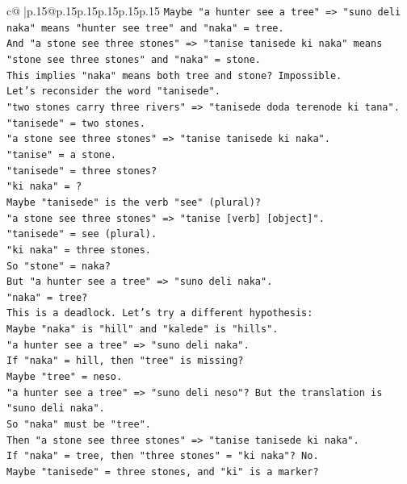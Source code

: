 \documentclass{article}
\begin{document}
{\begin{supertabular}{c@{$\;$}|p{.15\linewidth}@{}p{.15\linewidth}p{.15\linewidth}p{.15\linewidth}p{.15\linewidth}p{.15\linewidth}}
{{{\texttt{Maybe "a hunter see a tree" => "suno deli naka" means "hunter see tree" and "naka" = tree.} \\
\texttt{And "a stone see three stones" => "tanise tanisede ki naka" means "stone see three stones" and "naka" = stone.} \\
\texttt{This implies "naka" means both tree and stone? Impossible.} \\
\texttt{Let's reconsider the word "tanisede".} \\
\texttt{"two stones carry three rivers" => "tanisede doda terenode ki tana".} \\
\texttt{"tanisede" = two stones.} \\
\texttt{"a stone see three stones" => "tanise tanisede ki naka".} \\
\texttt{"tanise" = a stone.} \\
\texttt{"tanisede" = three stones?} \\
\texttt{"ki naka" = ?} \\
\texttt{Maybe "tanisede" is the verb "see" (plural)?} \\
\texttt{"a stone see three stones" => "tanise {[}verb{]} {[}object{]}".} \\
\texttt{"tanisede" = see (plural).} \\
\texttt{"ki naka" = three stones.} \\
\texttt{So "stone" = naka?} \\
\texttt{But "a hunter see a tree" => "suno deli naka".} \\
\texttt{"naka" = tree?} \\
\texttt{This is a deadlock. Let's try a different hypothesis:} \\
\texttt{Maybe "naka" is "hill" and "kalede" is "hills".} \\
\texttt{"a hunter see a tree" => "suno deli naka".} \\
\texttt{If "naka" = hill, then "tree" is missing?} \\
\texttt{Maybe "tree" = neso.} \\
\texttt{"a hunter see a tree" => "suno deli neso"? But the translation is "suno deli naka".} \\
\texttt{So "naka" must be "tree".} \\
\texttt{Then "a stone see three stones" => "tanise tanisede ki naka".} \\
\texttt{If "naka" = tree, then "three stones" = "ki naka"? No.} \\
\texttt{Maybe "tanisede" = three stones, and "ki" is a marker?} \\
}}}
\end{supertabular}}
\end{document}
